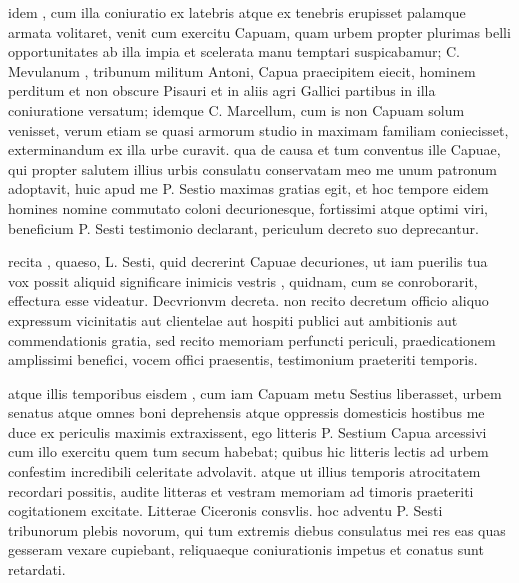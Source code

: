  idem , cum illa coniuratio ex latebris atque ex tenebris erupisset palamque armata volitaret, venit cum exercitu Capuam, quam urbem propter plurimas belli opportunitates ab illa impia et scelerata manu temptari suspicabamur; C. Mevulanum , tribunum militum Antoni, Capua praecipitem eiecit, hominem perditum et non obscure Pisauri et in aliis agri Gallici partibus in illa coniuratione versatum; idemque C. Marcellum, cum is non Capuam solum venisset, verum etiam se quasi armorum studio in maximam familiam coniecisset, exterminandum ex illa urbe curavit. qua de causa et tum conventus ille Capuae, qui propter salutem illius urbis consulatu conservatam meo me unum patronum adoptavit, huic apud me P. Sestio maximas gratias egit, et hoc tempore eidem homines nomine commutato coloni decurionesque, fortissimi atque optimi viri, beneficium P. Sesti testimonio declarant, periculum decreto suo deprecantur.

 recita , quaeso, L. Sesti, quid decrerint Capuae decuriones, ut iam puerilis tua vox possit aliquid significare inimicis vestris , quidnam, cum se conroborarit, effectura esse videatur. Decvrionvm decreta. non recito decretum officio aliquo expressum vicinitatis aut clientelae aut hospiti publici aut ambitionis aut commendationis gratia, sed recito memoriam perfuncti periculi, praedicationem amplissimi benefici, vocem offici praesentis, testimonium praeteriti temporis.

 atque illis temporibus eisdem , cum iam Capuam metu Sestius liberasset, urbem senatus atque omnes boni deprehensis atque oppressis domesticis hostibus me duce ex periculis maximis extraxissent, ego litteris P. Sestium Capua arcessivi cum illo exercitu quem tum secum habebat; quibus hic litteris lectis ad urbem confestim incredibili celeritate advolavit. atque ut illius temporis atrocitatem recordari possitis, audite litteras et vestram memoriam ad timoris praeteriti cogitationem excitate. Litterae Ciceronis consvlis. hoc adventu P. Sesti tribunorum plebis novorum, qui tum extremis diebus consulatus mei res eas quas gesseram vexare cupiebant, reliquaeque coniurationis impetus et conatus sunt retardati.

